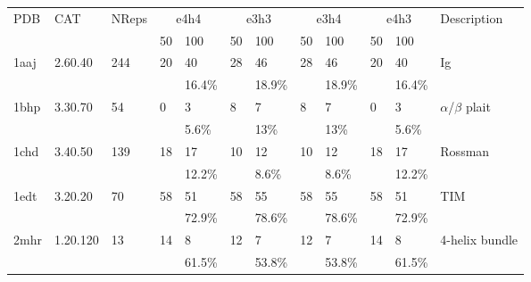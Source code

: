 \begin{sidewaystable}
\begin{center}
\begin{tabular}{llllllllllll} \hline
PDB   & CAT           & NReps & \multicolumn{2}{c}{e4h4} %
                                              & \multicolumn{2}{c}{e3h3} %
                                                              & \multicolumn{2}{c}{e3h4} %
                                                                              & \multicolumn{2}{c}{e4h3} %
                                                                                              & Description                             \\ \cline{4-11}
      &               &       & 50    & 100   & 50    & 100   & 50    & 100   & 50    & 100   &                                         \\ \hline
1aaj  & 2.60.40       & 244   & 20    & 40    & 28    & 46    & 28    & 46    & 20    & 40    & Ig                                      \\
      &               &       &       & 16.4\%&       & 18.9\%&       & 18.9\%&       & 16.4\%&                                         \\
1bhp  & 3.30.70       & 54    & 0     & 3     & 8     & 7     & 8     & 7     & 0     & 3     & $\alpha$/$\beta$ plait                  \\
      &               &       &       & 5.6\% &       & 13\%  &       & 13\%  &       & 5.6\% &                                         \\
1chd  & 3.40.50       & 139   & 18    & 17    & 10    & 12    & 10    & 12    & 18    & 17    & Rossman                                 \\
      &               &       &       & 12.2\%&       & 8.6\% &       & 8.6\% &       & 12.2\%&                                         \\
1edt  & 3.20.20       & 70    & 58    & 51    & 58    & 55    & 58    & 55    & 58    & 51    & TIM                                     \\
      &               &       &       & 72.9\%&       & 78.6\%&       & 78.6\%&       & 72.9\%&                                         \\
2mhr  & 1.20.120      & 13    & 14    & 8     & 12    & 7     & 12    & 7     & 14    & 8     & 4-helix bundle                          \\
      &               &       &       & 61.5\%&       & 53.8\%&       & 53.8\%&       & 61.5\%&                                         \\

\end{tabular}
\end{center}
\end{sidewaystable}
